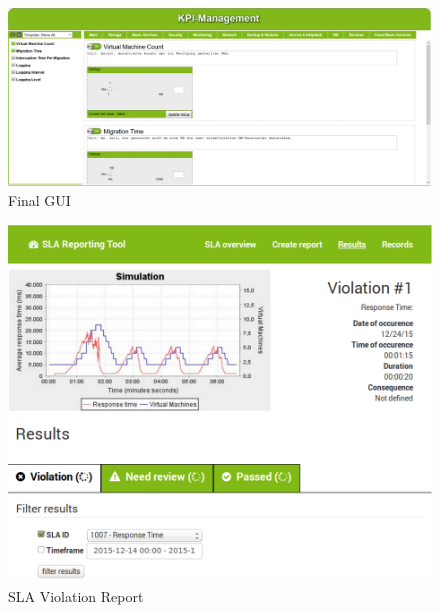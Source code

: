 \begin{figure}[ht]
	\centering
	\includegraphics[width=0.7\linewidth]{chapters/chapter5/fig/Gui1}
	\caption{Final GUI}
	\label{fig:gui1}
\end{figure}


\begin{figure}[ht]
	\centering
	\includegraphics[width=0.7\linewidth]{chapters/chapter5/fig/Gui2}
	\caption{SLA Violation Report}
	\label{fig:gui2}
\end{figure}


